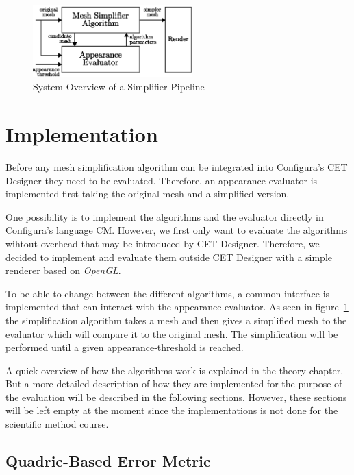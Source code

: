     \begin{figure}[h]
        \centering
        \includegraphics[width=0.55\textwidth]{figures/system_overview.eps}
        \caption{System Overview of a Simplifier Pipeline}
        \label{fig:system_overview}
    \end{figure}

    \section{Implementation} \label{sec:implementation}
    Before any mesh simplification algorithm can be integrated into Configura's CET Designer they need to be evaluated. Therefore, an appearance evaluator is implemented first taking the original mesh and a simplified version.

    One possibility is to implement the algorithms and the evaluator directly in Configura's language CM. However, we first only want to evaluate the algorithms wihtout overhead that may be introduced by CET Designer. Therefore, we decided to implement and evaluate them outside CET Designer with a simple renderer based on \emph{OpenGL}.

    To be able to change between the different algorithms, a common interface is implemented that can interact with the appearance evaluator. As seen in figure~\ref{fig:system_overview} the simplification algorithm takes a mesh and then gives a simplified mesh to the evaluator which will compare it to the original mesh. The simplification will be performed until a given appearance-threshold is reached.

    A quick overview of how the algorithms work is explained in the theory chapter. But a more detailed description of how they are implemented for the purpose of the evaluation will be described in the following sections. However, these sections will be left empty at the moment since the implementations is not done for the scientific method course.

        \subsection{Quadric-Based Error Metric} \label{sec:quadric-based_error_metric2}

